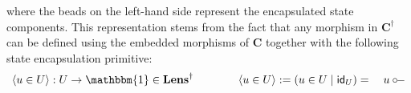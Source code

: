\documentclass[acmsmall,screen,review,anonymous]{acmart}
\newcommand{\kw}[1]{\ensuremath{ \mathsf{#1} }}
\renewcommand{\preceq}{\le}
\newcommand{\intl}[1]{\underline{#1}}
\begin{document}
where the beads on the left-hand side
represent the encapsulated state components.
This representation stems from the fact that
any morphism in $\mathbf{C}^\dagger$
can be defined using the embedded morphisms of $\mathbf{C}$
together with the following state encapsulation primitive:
\[
  \langle u \in U \rangle : U \rightarrow \mathbbm{1} \in \mathbf{Lens}^\dagger
  \qquad \qquad
  \langle u \in U \rangle  :=  (u \in U \mid \kw{id}_U)
    = \quad u \circ \!\!-
\]

%

\end{document}
